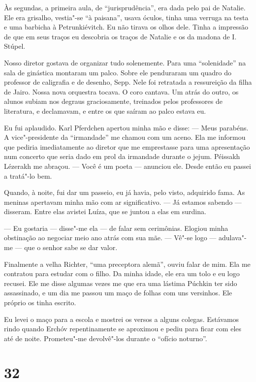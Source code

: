 Às segundas, a primeira aula, de ``jurisprudência'', era dada pelo pai
de Natalie. Ele era grisalho, vestia"-se ``à paisana'', usava óculos,
tinha uma verruga na testa e uma barbicha à Petrunkiévitch. Eu não
tirava os olhos dele. Tinha a impressão de que em seus traços eu
descobria os traços de Natalie e os da madona de I. Stúpel.

Nosso diretor gostava de organizar tudo solenemente. Para uma
``solenidade'' na sala de ginástica montaram um palco. Sobre ele
penduraram um quadro do professor de caligrafia e de desenho, Sepp. Nele
foi retratada a ressureição da filha de Jairo. Nossa nova orquestra
tocava. O coro cantava. Um atrás do outro, os alunos subiam nos degraus
graciosamente, treinados pelos professores de literatura, e declamavam,
e entre os que saíram ao palco estava eu.

Eu fui aplaudido. Karl Pferdchen apertou minha mão e disse: --- Meus
parabéns. A vice"-presidente da ``irmandade'' me chamou com um aceno. Ela
me informou que pediria imediatamente ao diretor que me emprestasse para
uma apresentação num concerto que seria dado em prol da irmandade
durante o jejum. Péissakh Lézerakh me abraçou. --- Você é um poeta ---
anunciou ele. Desde então eu passei a tratá"-lo bem.

Quando, à noite, fui dar um passeio, eu já havia, pelo visto, adquirido
fama. As meninas apertavam minha mão com ar significativo. --- Já
estamos sabendo --- disseram. Entre elas avistei Luíza, que se juntou a
elas em surdina.

--- Eu gostaria --- disse"-me ela --- de falar sem cerimônias. Elogiou
minha obstinação ao negociar meio ano atrás com sua mãe. --- Vê"-se logo
--- adulava"-me --- que o senhor sabe se dar valor.

Finalmente a velha Richter, ``uma preceptora alemã'', ouviu falar de
mim. Ela me contratou para estudar com o filho. Da minha idade, ele era
um tolo e eu logo recusei. Ele me disse algumas vezes me que era uma
lástima Púchkin ter sido assassinado, e um dia me passou um maço de
folhas com uns versinhos. Ele próprio os tinha escrito.

Eu levei o maço para a escola e mostrei os versos a alguns colegas.
Estávamos rindo quando Erchóv repentinamente se aproximou e pediu para
ficar com eles até de noite. Prometeu"-me devolvê"-los durante o ``ofício
noturno''.

\section{32}

